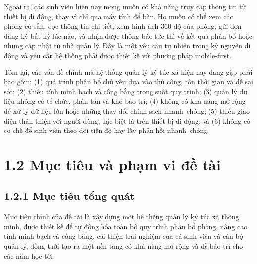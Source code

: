 \documentclass[a4paper,12pt]{report}
\begin{document}
Ngoài ra, các sinh viên hiện nay mong muốn có khả năng truy cập thông tin từ thiết bị di động, thay vì chỉ qua máy tính để bàn. Họ muốn có thể xem các phòng có sẵn, đọc thông tin chi tiết, xem hình ảnh 360 độ của phòng, gửi đơn đăng ký bất kỳ lúc nào, và nhận được thông báo tức thì về kết quả phân bổ hoặc những cập nhật từ nhà quản lý. Đây là một yêu cầu tự nhiên trong kỷ nguyên di động và yêu cầu hệ thống phải được thiết kế với phương pháp mobile-first.

Tóm lại, các vấn đề chính mà hệ thống quản lý ký túc xá hiện nay đang gặp phải bao gồm: (1) quá trình phân bổ chủ yếu dựa vào thủ công, tốn thời gian và dễ sai sót; (2) thiếu tính minh bạch và công bằng trong suốt quy trình; (3) quản lý dữ liệu không có tổ chức, phân tán và khó bảo trì; (4) không có khả năng mở rộng để xử lý dữ liệu lớn hoặc những thay đổi chính sách nhanh~chóng; (5) thiếu giao diện thân thiện với người dùng, đặc biệt là trên thiết bị di động; và (6) không có cơ chế để sinh viên theo dõi tiến độ hay lấy phản hồi nhanh~chóng.

\section*{1.2 Mục tiêu và phạm vi đề tài}

\subsection*{1.2.1 Mục tiêu tổng quát}

Mục tiêu chính của đề tài là xây dựng một hệ thống quản lý ký túc xá thông minh, được thiết kế để tự động hóa toàn bộ quy trình phân bổ phòng, nâng cao tính minh bạch và công bằng, cải thiện trải nghiệm của cả sinh viên và cán bộ quản lý, đồng thời tạo ra một nền tảng có khả năng mở rộng và dễ bảo trì cho các năm học tới.
\end{document}
